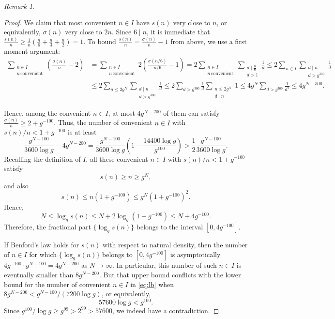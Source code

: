 \documentclass[11pt, reqno]{amsart}
\theoremstyle{remark}
\newtheorem*{remark}{Remark}
\numberwithin{theorem}{section}
\numberwithin{proposition}{section}
\numberwithin{lemma}{section}
\numberwithin{corollary}{section}
\numberwithin{equation}{section}
\numberwithin{conjecture}{section}
\numberwithin{definition}{section}
\begin{document}
\begin{remark}
\begin{proof}
We claim that most convenient $n\in I$ have $s(n)$ very close to $n$, or equivalently, $\sigma(n)$ very close to $2n$. Since $6\mid n$, it is immediate that $\frac{s(n)}{n} \ge \frac{1}{n} \left(\frac{n}{6} + \frac{n}{3} + \frac{n}{2}\right) = 1$. To bound $\frac{s(n)}{n} = \frac{\sigma(n)}{n}-1$ from above, we use a first moment argument: 
\begin{align*}
  \sum_{\substack{n\in I\\n\,\text{convenient}}} \left(\frac{\sigma(n)}{n} - 2\right) &= \sum_{\substack{n\in I\\n\,\text{convenient}}} 2\left(\frac{\sigma(n/6)}{n/6}-1\right) 
        = 2 \sum_{\substack{n\in I\\n\,\text{convenient}}} \sum_{\substack{d \mid \frac{n}{6}\\d > 1}} \frac{1}{d} \le 2 \sum_{n\in I} \sum_{\substack{d\mid n\\d > g^{300}}} \frac{1}{d}\\
        &\le 2 \sum_{n \le 2g^N} \sum_{\substack{d\mid n\\d > g^{300}}} \frac{1}{d}
        \le 2 \sum_{d > g^{300}} \frac{1}{d} \sum_{\substack{n \le 2g^N\\d \mid n}} 1
        \le 4 g^N \sum_{d > g^{300}} \frac{1}{d^2}
        \le 4 g^{N-300}.\end{align*}
        
Hence, among the convenient $n \in I$, at most $4 g^{N-200}$ of them can satisfy $\frac{\sigma(n)}{n} \ge 2 + g^{-100}$. Thus, the number of convenient $n \in I$
with $s(n)/n < 1 + g^{-100}$ is at least \begin{equation}\label{eq:lb} 
   \frac{g^{N-100}}{3600 \log g} - 4 g^{N-200} = \frac{g^{N-100}}{3600 \log g} \left(1 - \frac{14400 \log g}{g^{100}}\right)
            > \frac{1}{2} \frac{g^{N-100}}{3600 \log g}. \end{equation}
Recalling the definition of $I$, all these convenient $n\in I$ with $s(n)/n < 1 + g^{-100}$ satisfy 
\[	s(n) \ge n \ge g^{N},\]
and also
\[ s(n) \le n(1+g^{-100}) \le g^{N} (1+g^{-100})^2. \]
Hence,
\[ N \le \log_g{s(n)} \le N + 2 \log_{g} (1+g^{-100}) \le N + 4 g^{-100}. \]
Therefore, the fractional part $\{\log_g s(n)\}$ belongs to the interval $[0, 4g^{-100}]$. 

If Benford's law holds for $s(n)$ with respect to natural density, then the number of $n \in I$ for which
$\{\log_g s(n)\}$ belongs to $[0, 4g^{-100}]$ is asymptotically $4g^{-100} \cdot g^{N-100} = 4g^{N-200}$ as $N\to\infty$. In particular, this number of such $n\in I$
is eventually smaller than $8g^{N-200}$. But that upper bound conflicts with the lower bound for the number of convenient $n\in I$ in \eqref{eq:lb} when $8g^{N-200} < g^{N-100}/(7200 \log g)$, or equivalently,
\[ 57600 \log g < g^{100}. \]
Since $g^{100}/\log g \ge g^{99} > 2^{99} > 57600$, we indeed have a contradiction.

\end{proof}

\end{remark}
\end{document}
